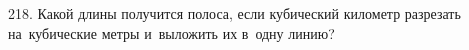 218. Какой длины получится полоса, если кубический километр разрезать на кубические метры и выложить их в одну линию?\\
